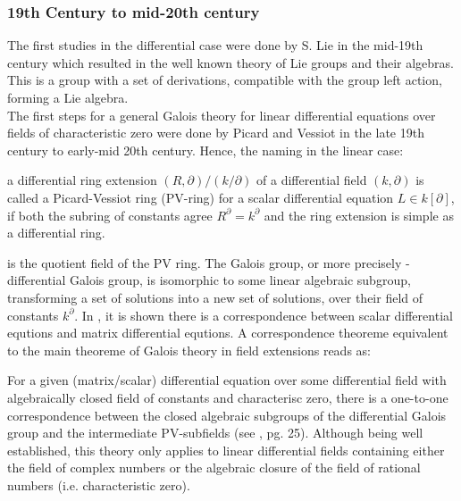 \subsubsection{19th Century to mid-20th century}
The first studies in the differential case were done by S. Lie in the mid-19th century which resulted in the well known theory of Lie groups and their algebras. This is a group with a set of derivations, compatible with the group left action, forming a Lie algebra.\\
\indent The first steps for a general Galois theory for linear differential equations over fields of characteristic zero were done by Picard and Vessiot in the late 19th century to early-mid 20th century. Hence, the naming in the linear case:
\bd
\item[Picard-Vessiot ring] a differential ring extension $(R,\partial)/(k/\partial)$ of a differential field $(k,\partial)$ is called a Picard-Vessiot ring (PV-ring) for a scalar differential equation $L \in k[\partial]$, if both the subring of constants agree $R^\partial = k^\partial$ and the ring extension is simple as a differential ring.
\item[Picard-Vessiot field] is the quotient field of the PV ring.
\ed
The Galois group, or more precisely - differential Galois group, is isomorphic to some linear algebraic subgroup, transforming a set of solutions into a new set of solutions, over their field of constants $k^\partial$. In \cite{vdPS01}, it is shown there is a correspondence between scalar differential equtions and matrix differential equtions. A correspondence theoreme equivalent to the main theoreme of Galois theory in field extensions reads as:
\bd
\item[Galois Correspondence] For a given (matrix/scalar) differential equation over some differential field with algebraically closed field of constants and characterisc zero, there is a one-to-one correspondence between the closed algebraic subgroups of the differential Galois group and the intermediate PV-subfields 
(see \cite{vdPS01}, pg. 25).
\ed
Although being well established, this theory only applies to linear differential fields containing either the field of complex numbers or the algebraic closure of the field of rational numbers (i.e. characteristic zero).
